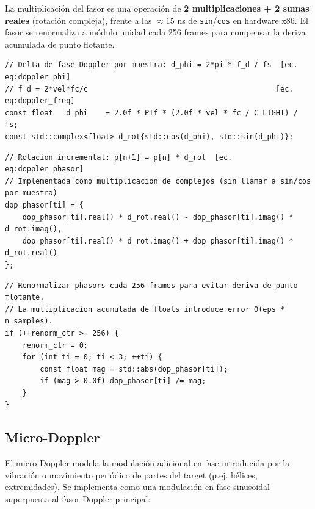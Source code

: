 \documentclass[11pt,a4paper]{article}
\begin{document}
La multiplicación del fasor es una operación de \textbf{2 multiplicaciones + 2 sumas reales}
(rotación compleja), frente a las $\approx 15$ ns de \texttt{sin}/\texttt{cos} en hardware
x86. El fasor se renormaliza a módulo unidad cada 256 frames para compensar la deriva
acumulada de punto flotante.

\begin{lstlisting}[style=cpp,
  caption={Inicialización del fasor Doppler — ChannelSimulator.cpp, líneas 146--147}]
// Delta de fase Doppler por muestra: d_phi = 2*pi * f_d / fs  [ec. eq:doppler_phi]
// f_d = 2*vel*fc/c                                           [ec. eq:doppler_freq]
const float   d_phi    = 2.0f * PIf * (2.0f * vel * fc / C_LIGHT) / fs;
const std::complex<float> d_rot{std::cos(d_phi), std::sin(d_phi)};
\end{lstlisting}

\begin{lstlisting}[style=cpp,
  caption={Avance incremental del fasor — ChannelSimulator.cpp, líneas 168--172}]
// Rotacion incremental: p[n+1] = p[n] * d_rot  [ec. eq:doppler_phasor]
// Implementada como multiplicacion de complejos (sin llamar a sin/cos por muestra)
dop_phasor[ti] = {
    dop_phasor[ti].real() * d_rot.real() - dop_phasor[ti].imag() * d_rot.imag(),
    dop_phasor[ti].real() * d_rot.imag() + dop_phasor[ti].imag() * d_rot.real()
};
\end{lstlisting}

\begin{lstlisting}[style=cpp,
  caption={Renormalización del fasor cada 256 frames — ChannelSimulator.cpp, líneas 184--191}]
// Renormalizar phasors cada 256 frames para evitar deriva de punto flotante.
// La multiplicacion acumulada de floats introduce error O(eps * n_samples).
if (++renorm_ctr >= 256) {
    renorm_ctr = 0;
    for (int ti = 0; ti < 3; ++ti) {
        const float mag = std::abs(dop_phasor[ti]);
        if (mag > 0.0f) dop_phasor[ti] /= mag;
    }
}
\end{lstlisting}

\subsection{Micro-Doppler}

El micro-Doppler modela la modulación adicional en fase introducida por la vibración
o movimiento periódico de partes del target (p.ej. hélices, extremidades). Se implementa
como una modulación en fase sinusoidal superpuesta al fasor Doppler principal:
\end{document}
